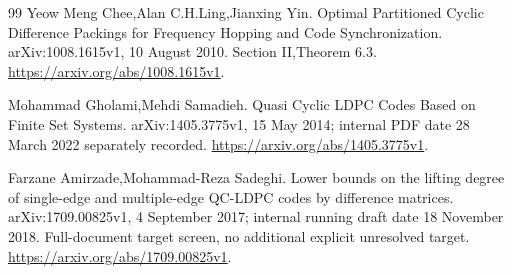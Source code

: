 \documentclass[11pt]{article}
\begin{document}
\begin{thebibliography}{99}
 Yeow Meng Chee,Alan C.H.Ling,Jianxing Yin. Optimal Partitioned Cyclic Difference Packings for Frequency Hopping and Code Synchronization. arXiv:1008.1615v1, 10 August 2010. Section II,Theorem 6.3. \url{https://arxiv.org/abs/1008.1615v1}.

 Mohammad Gholami,Mehdi Samadieh. Quasi Cyclic LDPC Codes Based on Finite Set Systems. arXiv:1405.3775v1, 15 May 2014; internal PDF date 28 March 2022 separately recorded. \url{https://arxiv.org/abs/1405.3775v1}.

 Farzane Amirzade,Mohammad-Reza Sadeghi. Lower bounds on the lifting degree of single-edge and multiple-edge QC-LDPC codes by difference matrices. arXiv:1709.00825v1, 4 September 2017; internal running draft date 18 November 2018. Full-document target screen, no additional explicit unresolved target. \url{https://arxiv.org/abs/1709.00825v1}.

\end{thebibliography}
\appendix

\end{document}
